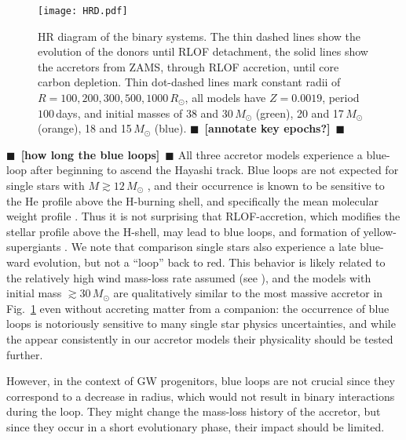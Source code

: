 \documentclass[twocolumn,twocolappendix,trackchanges]{aastex63}
\DeclareRobustCommand{\Figref}[1]{Fig.~\ref{#1}}
\newcommand{\todo}[1]{{\large $\blacksquare$~\textbf{\color{red}[#1]}}~$\blacksquare$}
\begin{document}
\begin{figure}[htbp]
  \texttt{[image: HRD.pdf]}
  \caption{HR diagram of the binary systems. The thin dashed lines
    show the evolution of the donors until RLOF detachment, the solid
    lines show the accretors from ZAMS, through RLOF accretion, until
    core carbon depletion. Thin dot-dashed lines mark constant radii
    of $R=100, 200, 300, 500, 1000\,R_\odot$, all models have
    $Z=0.0019$, period $100$\,days, and initial masses of 38 and
    30\,$M_\odot$ (green), 20 and 17\,$M_\odot$ (orange), 18 and
    15\,$M_\odot$ (blue). \todo{annotate key epochs?}}
  \label{fig:HRD}
\end{figure}

\todo{how long the blue loops}
All three accretor models experience a blue-loop after beginning to
ascend the Hayashi track. Blue loops are not expected for single stars
with $M\gtrsim 12\,M_\odot$ \citep[e.g.,][]{walmswell:2015}, and their
occurrence is known to be sensitive to the He profile above the
H-burning shell, and specifically the mean molecular weight profile
\citep{walmswell:2015, farrell:22}. Thus it is not surprising that
RLOF-accretion, which modifies the stellar profile above the H-shell,
may lead to blue loops, and formation of yellow-supergiants
\citep[e.g.,][]{dorn-wallenstein:20}. We note that comparison single
stars also experience a late blue-ward evolution, but not a ``loop''
back to red. This behavior is likely related to the relatively high
wind mass-loss rate assumed (see \citealt{renzo:2017}), and the models with
initial mass $\gtrsim 30\,M_\odot$ are qualitatively similar to the
most massive accretor in \Figref{fig:HRD} even without accreting
matter from a companion: the occurrence of blue loops is notoriously
sensitive to many single star physics uncertainties, and while the
appear consistently in our accretor models their physicality should be
tested further.

However, in the context of GW progenitors, blue loops are not crucial
since they correspond to a decrease in radius, which would not result
in binary interactions during the loop. They might change the
mass-loss history of the accretor, but since they occur in a short
evolutionary phase, their impact should be
limited. %
\end{document}
